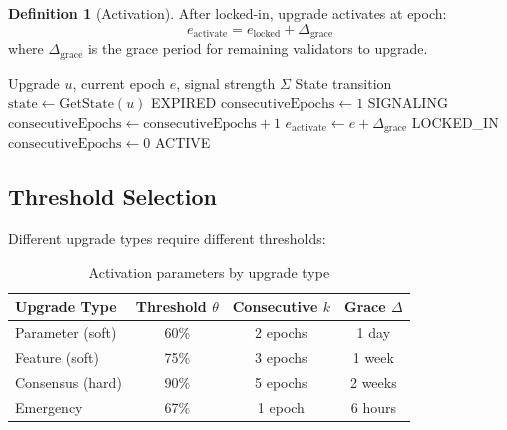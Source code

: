 \documentclass[11pt,a4paper]{article}
\theoremstyle{definition}
\newtheorem{definition}{Definition}[section]
\theoremstyle{remark}
\begin{document}
\begin{definition}[Activation]
After locked-in, upgrade activates at epoch:
\begin{equation}
    e_{\text{activate}} = e_{\text{locked}} + \Delta_{\text{grace}}
\end{equation}
where $\Delta_{\text{grace}}$ is the grace period for remaining validators to upgrade.
\end{definition}

\begin{algorithm}
\caption{Upgrade Activation State Machine}
\begin{algorithmic}[1]
\Require Upgrade $u$, current epoch $e$, signal strength $\Sigma$
\Ensure State transition
\State $\text{state} \gets \text{GetState}(u)$
            \State \Return EXPIRED
            \State $\text{consecutiveEpochs} \gets 1$
            \State \Return SIGNALING
        \EndIf
    \EndCase
            \State $\text{consecutiveEpochs} \gets \text{consecutiveEpochs} + 1$
                \State $e_{\text{activate}} \gets e + \Delta_{\text{grace}}$
                \State \Return LOCKED\_IN
            \EndIf
        \Else
            \State $\text{consecutiveEpochs} \gets 0$
        \EndIf
    \EndCase
            \State \Return ACTIVE
        \EndIf
    \EndCase
\EndSwitch
\end{algorithmic}
\end{algorithm}

\subsection{Threshold Selection}

Different upgrade types require different thresholds:

\begin{table}[h]
\centering
\begin{tabular}{lccc}
\toprule
Upgrade Type & Threshold $\theta$ & Consecutive $k$ & Grace $\Delta$ \\
\midrule
Parameter (soft) & 60\% & 2 epochs & 1 day \\
Feature (soft) & 75\% & 3 epochs & 1 week \\
Consensus (hard) & 90\% & 5 epochs & 2 weeks \\
Emergency & 67\% & 1 epoch & 6 hours \\
\bottomrule
\end{tabular}
\caption{Activation parameters by upgrade type}
\end{table}
\end{document}
